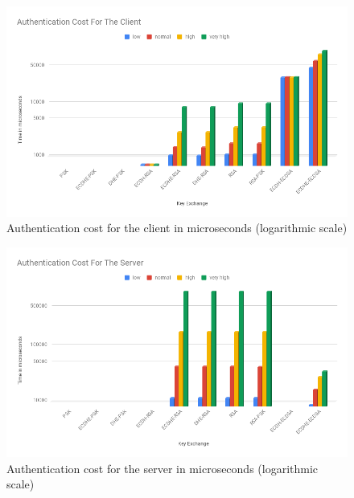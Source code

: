 				  \begin{figure}
					\centering
					\includegraphics[width=1.0\textwidth]{img/papi-client-auth-cost.png}
					\centering \caption{Authentication cost for the client in microseconds (logarithmic scale)}
					\label{af:1}
				  \end{figure}
  
				  \begin{figure}
					\centering
					\includegraphics[width=1.0\textwidth]{img/papi-server-auth-cost.png}
					\centering \caption{Authentication cost for the server in microseconds (logarithmic scale)}
					\label{af:2}
				  \end{figure}
  
